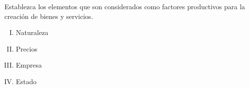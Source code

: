 Establezca  los elementos que son considerados como factores productivos para la creación de bienes y servicios. 

	\begin{enumerate}[I.]
	\item Naturaleza
	\item Precios
	\item Empresa 
	\item Estado
	
\end{enumerate}
